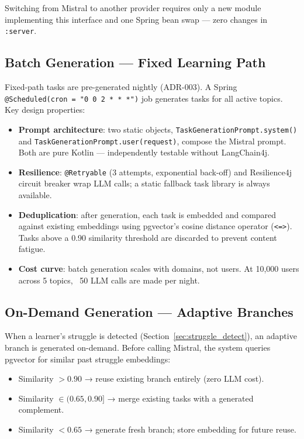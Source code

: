 Switching from Mistral to another provider requires only a new module implementing this interface and one Spring bean swap — zero changes in \texttt{:server}.

\subsection{Batch Generation — Fixed Learning Path}
\label{ssec:batch_generation}

Fixed-path tasks are pre-generated nightly (ADR-003). A Spring \texttt{@Scheduled(cron = "0 0 2 * * *")} job generates tasks for all active topics. Key design properties:

\begin{itemize}
    \item \textbf{Prompt architecture}: two static objects, \texttt{TaskGenerationPrompt.system()} and \texttt{TaskGenerationPrompt.user(request)}, compose the Mistral prompt. Both are pure Kotlin — independently testable without LangChain4j.
    \item \textbf{Resilience}: \texttt{@Retryable} (3 attempts, exponential back-off) and Resilience4j circuit breaker wrap LLM calls; a static fallback task library is always available.
    \item \textbf{Deduplication}: after generation, each task is embedded and compared against existing embeddings using pgvector's cosine distance operator (\texttt{<=>}). Tasks above a 0.90 similarity threshold are discarded to prevent content fatigue.
    \item \textbf{Cost curve}: batch generation scales with domains, not users. At 10,000 users across 5 topics, ~50 LLM calls are made per night.
\end{itemize}

\subsection{On-Demand Generation — Adaptive Branches}
\label{ssec:adaptive_generation}

When a learner's struggle is detected (Section~\ref{sec:struggle_detect}), an adaptive branch is generated on-demand. Before calling Mistral, the system queries pgvector for similar past struggle embeddings:

\begin{itemize}
    \item Similarity $> 0.90$ → reuse existing branch entirely (zero LLM cost).
    \item Similarity $\in (0.65, 0.90]$ → merge existing tasks with a generated complement.
    \item Similarity $< 0.65$ → generate fresh branch; store embedding for future reuse.
\end{itemize}

